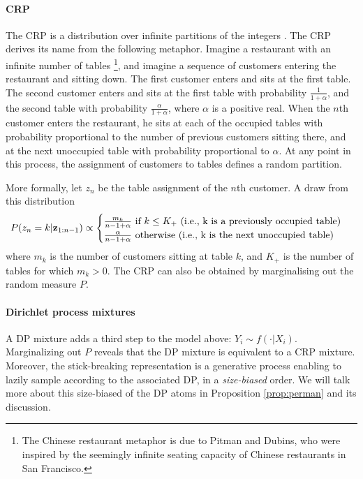 \paragraph{\acrlong{CRP}}
The \gls{CRP} is a distribution over infinite partitions of the integers \cite{PitmanCRP,AldousCRP}.
The \gls{CRP} derives its name from the following metaphor. Imagine a restaurant with an infinite number of tables \footnote{The Chinese restaurant metaphor is due to Pitman and Dubins, who were inspired by the seemingly infinite seating capacity of Chinese restaurants in San Francisco.}, and imagine a sequence of customers entering the restaurant and sitting down. The first customer enters and sits at the first table. The second customer enters and sits at the first table with probability $\frac{1}{1+\alpha}$, and the second table with probability $\frac{\alpha}{1+\alpha}$, where $\alpha$ is a positive real. When the $n$th customer enters the restaurant, he sits at each of the occupied tables with probability proportional to the number of previous customers sitting there, and at the next unoccupied table with probability proportional to $\alpha$. At any point in this process, the assignment of customers to tables defines a random partition.

More formally, let $z_n$ be the table assignment of the $n$th customer. A draw from this distribution
\begin{equation*}
P(z_n = k | \mbz_{1:n-1})
\propto \begin{cases} \frac{m_k}{n-1+\alpha} \ \text{if} \ k \le K_+\ \text{(i.e., k is a previously occupied table)} \\ 
 \frac{\alpha}{n-1+\alpha} \ \text{otherwise} \ \text{(i.e., k is the next unoccupied table)} \end{cases}
\end{equation*}
where $m_k$ is the number of customers sitting at table $k$, and $K_+$ is the number of tables for which $m_k > 0$. The \gls{CRP} can also be obtained by marginalising out the random measure $P$.

\paragraph{Dirichlet process mixtures}
A \gls{DP} mixture adds a third step to the model above: $Y_i \sim f(\cdot|X_i)$. Marginalizing out $P$ reveals that the \gls{DP} mixture is equivalent to a \gls{CRP} mixture. Moreover, the stick-breaking representation is a generative process enabling to lazily sample according to the associated \gls{DP}, in a \textit{size-biased} order. We will talk more about this size-biased of the \gls{DP} atoms in Proposition \ref{prop:perman} and its discussion.


